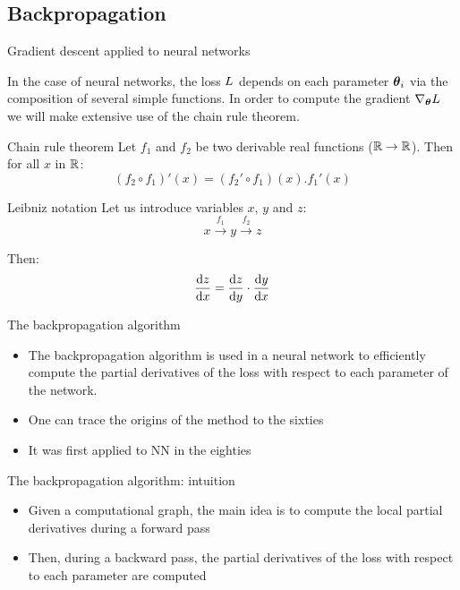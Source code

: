 \documentclass[xcolor=pdftex,dvipsnames,table,mathserif]{beamer}
\begin{document}
\subsection{Backpropagation}


\begin{frame}{Gradient descent applied to neural networks}

  In the case of neural networks, the loss $L$ depends on each parameter $\boldsymbol{\theta}_i$ via the composition of several simple functions. In order to compute the gradient $\nabla_{\boldsymbol{\theta}}L$ we will make extensive use of the chain rule theorem.

  \begin{block}{Chain rule theorem}
    Let $f_1$ and $f_2$ be two derivable real functions ($\mathbb{R} \rightarrow \mathbb{R}$). Then for all $x$ in $\mathbb{R}$:
    \[
    (f_2 \circ f_1)'(x) = (f_2'\circ f_1)(x).f_1'(x)
    \]
  \end{block}


  \begin{block}{Leibniz notation}
    Let us introduce variables $x$, $y$ and $z$:
    \[x \xrightarrow{f_1} y \xrightarrow{f_2} z\]

    Then:
    \[\dv{z}{x} = \dv{z}{y} \cdot \dv{y}{x} \]

  \end{block}

\end{frame}


\begin{frame}{The backpropagation algorithm}

  \begin{itemize}
  \item The backpropagation algorithm is used in a neural network to efficiently compute the partial derivatives of the loss with respect to each parameter of the network.
  \item One can trace the origins of the method to the sixties
  \item It was first applied to NN in the eighties \cite{werbos_applications_1982, lecun_procedure_1985}
  \end{itemize}


\end{frame}


\begin{frame}{The backpropagation algorithm: intuition}

  \begin{itemize}
  \item Given a computational graph, the main idea is to compute the local partial derivatives during a forward pass
  \item Then, during a backward pass, the partial derivatives of the loss with respect to each parameter are computed
  \end{itemize}


\end{frame}
\end{document}
